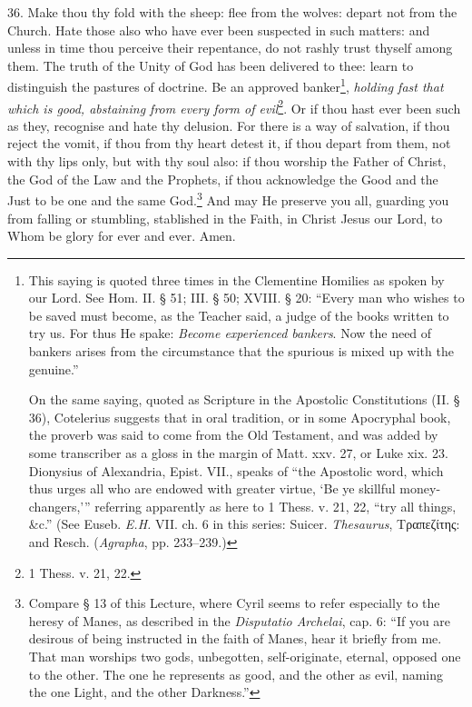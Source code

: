36. Make thou thy fold with the sheep: flee from the wolves: depart not from the Church. Hate those also who have ever been suspected in such matters: and unless in time thou perceive their repentance, do not rashly trust thyself among them. The truth of the Unity of God has been delivered to thee: learn to distinguish the pastures of doctrine. Be an approved banker\footnote{This saying is quoted three times in the Clementine Homilies as spoken by our Lord. See Hom. II. § 51; III. § 50; XVIII. § 20: “Every man who wishes to be saved must become, as the Teacher said, a judge of the books written to try us. For thus He spake: \emph{Become experienced bankers}. Now the need of bankers arises from the circumstance that the spurious is mixed up with the genuine.” \par On the same saying, quoted as Scripture in the Apostolic Constitutions (II. § 36), Cotelerius suggests that in oral tradition, or in some Apocryphal book, the proverb was said to come from the Old Testament, and was added by some transcriber as a gloss in the margin of Matt. xxv. 27, or Luke xix. 23. Dionysius of Alexandria, Epist. VII., speaks of “the Apostolic word, which thus urges all who are endowed with greater virtue, ‘Be ye skillful money-changers,’” referring apparently as here to 1 Thess. v. 21, 22, “try all things, \&c.” (See Euseb. \emph{E.H.} VII. ch. 6 in this series: Suicer. \emph{Thesaurus}, \textgreek{Τραπεζίτης}: and Resch. (\emph{Agrapha}, pp. 233–239.)}, \emph{holding fast that which is good, abstaining from every form of evil}\footnote{1 Thess. v. 21, 22.}. Or if thou hast ever been such as they, recognise and hate thy delusion. For there is a way of salvation, if thou reject the vomit, if thou from thy heart detest it, if thou depart from them, not with thy lips only, but with thy soul also: if thou worship the Father of Christ, the God of the Law and the Prophets, if thou acknowledge the Good and the Just to be one and the same God.\footnote{Compare § 13 of this Lecture, where Cyril seems to refer especially to the heresy of Manes, as described in the \emph{Disputatio Archelai}, cap. 6: “If you are desirous of being instructed in the faith of Manes, hear it briefly from me. That man worships two gods, unbegotten, self-originate, eternal, opposed one to the other. The one he represents as good, and the other as evil, naming the one Light, and the other Darkness.”} And may He preserve you all, guarding you from falling or stumbling, stablished in the Faith, in Christ Jesus our Lord, to Whom be glory for ever and ever. Amen.

